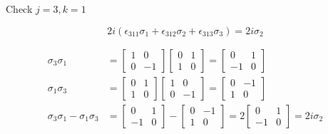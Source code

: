 \documentclass[11pt]{article}
\begin{document}
\begin{enumerate}
\begin{enumerate}
		            Check $j = 3, k = 1$

		            \begin{equation*}
			            2i(\epsilon_{311} \sigma_1 + \epsilon_{312} \sigma_2 + \epsilon_{313} \sigma_3) = 2i\sigma_2
		            \end{equation*}

		            \begin{align*}
			            \sigma_3 \sigma_1 & =
			            \begin{bmatrix}
				            1 & 0 \\ 0 & -1
			            \end{bmatrix}
			            \begin{bmatrix}
				            0 & 1 \\ 1 & 0
			            \end{bmatrix} =
			            \begin{bmatrix}
				            0 & 1 \\ -1 & 0
			            \end{bmatrix}       \\
			            \sigma_1 \sigma_3 & =
			            \begin{bmatrix}
				            0 & 1 \\ 1 & 0
			            \end{bmatrix}
			            \begin{bmatrix}
				            1 & 0 \\ 0 & -1
			            \end{bmatrix} =
			            \begin{bmatrix}
				            0 & -1 \\ 1 & 0
			            \end{bmatrix}       \\
			            \sigma_3 \sigma_1 - \sigma_1 \sigma_3 & =
			            \begin{bmatrix}
				            0 & 1 \\ -1 & 0
			            \end{bmatrix} -
			            \begin{bmatrix}
				            0 & -1 \\ 1 & 0
			            \end{bmatrix} =
			            2 \begin{bmatrix}
                      0 & 1 \\ -1 & 0
			               \end{bmatrix} = 2i\sigma_2
		            \end{align*}


\end{enumerate}
\end{enumerate}
\end{document}
